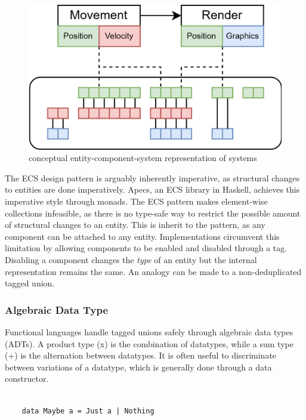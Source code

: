 \documentclass{article}
\begin{document}
\begin{figure}[ht]
    \centering
    \includegraphics[scale=0.2]{ecs}
    \caption{ conceptual entity-component-system representation of systems }
\end{figure}

The ECS design pattern is arguably inherently imperative, as structural changes to entities are done imperatively.
Apecs, an ECS library in Haskell, achieves this imperative style through monads\cite{ecs-apecs}.
The ECS pattern makes element-wise collections infeasible, as there is no type-safe way to restrict the possible amount of structural changes to an entity.
This is inherit to the pattern, as any component can be attached to any entity.
Implementations circumvent this limitation by allowing components to be enabled and disabled through a tag.
Disabling a component changes the {\it type} of an entity but the internal representation remains the same.
An analogy can be made to a non-deduplicated tagged union. 


\newpage

\subsubsection{Algebraic Data Type}

Functional languages handle tagged unions safely through algebraic data types (ADTs).
A product type (x) is the combination of datatypes, while a sum type (+) is the alternation between datatypes.
It is often useful to discriminate between variations of a datatype, which is generally done through a data constructor. 

\begin{verbatim}
    
    data Maybe a = Just a | Nothing
    
\end{verbatim}
\end{document}
